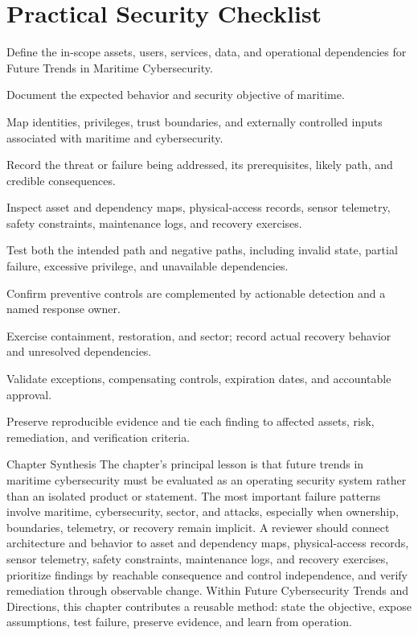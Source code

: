 \documentclass[11pt,letterpaper]{article}
\begin{document}
\section*{Practical Security Checklist}
\begin{CornellChecklist}
\item Define the in-scope assets, users, services, data, and operational dependencies for Future Trends in Maritime Cybersecurity.
\item Document the expected behavior and security objective of maritime.
\item Map identities, privileges, trust boundaries, and externally controlled inputs associated with maritime and cybersecurity.
\item Record the threat or failure being addressed, its prerequisites, likely path, and credible consequences.
\item Inspect asset and dependency maps, physical-access records, sensor telemetry, safety constraints, maintenance logs, and recovery exercises.
\item Test both the intended path and negative paths, including invalid state, partial failure, excessive privilege, and unavailable dependencies.
\item Confirm preventive controls are complemented by actionable detection and a named response owner.
\item Exercise containment, restoration, and sector; record actual recovery behavior and unresolved dependencies.
\item Validate exceptions, compensating controls, expiration dates, and accountable approval.
\item Preserve reproducible evidence and tie each finding to affected assets, risk, remediation, and verification criteria.
\end{CornellChecklist}
\begin{CornellSummaryBox}{Chapter Synthesis}
The chapter's principal lesson is that future trends in maritime cybersecurity must be evaluated as an operating security system rather than an isolated product or statement. The most important failure patterns involve maritime, cybersecurity, sector, and attacks, especially when ownership, boundaries, telemetry, or recovery remain implicit. A reviewer should connect architecture and behavior to asset and dependency maps, physical-access records, sensor telemetry, safety constraints, maintenance logs, and recovery exercises, prioritize findings by reachable consequence and control independence, and verify remediation through observable change. Within Future Cybersecurity Trends and Directions, this chapter contributes a reusable method: state the objective, expose assumptions, test failure, preserve evidence, and learn from operation.
\end{CornellSummaryBox}
\end{document}
